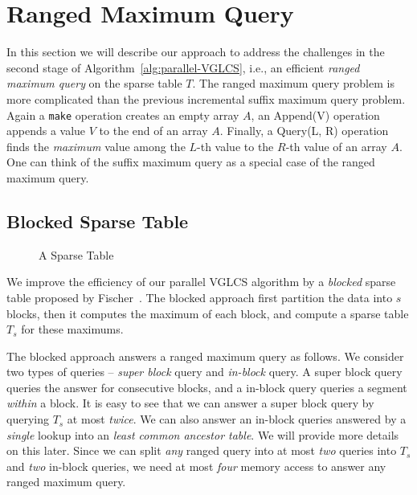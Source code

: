\section{Ranged Maximum Query} \label{sec:parallelRMQ}

In this section we will describe our approach to address the
challenges in the second stage of Algorithm~\ref{alg:parallel-VGLCS},
i.e., an efficient {\em ranged maximum query} on the sparse table $T$.
The ranged maximum query problem is more complicated than the previous
incremental suffix maximum query problem.  Again a {\tt make}
operation creates an empty array $A$, an {\sc Append(V)} operation
appends a value $V$ to the end of an array $A$.  Finally, a {\sc
  Query(L, R)} operation finds the {\em maximum} value among the
$L$-th value to the $R$-th value of an array $A$.  One can think of
the suffix maximum query as a special case of the ranged maximum
query.


\subsection{Blocked Sparse Table} \label{sec:blocked-sparse-table}

\begin{figure}[!thb]
  \centering {} 
  \caption{A Sparse Table}
  \label{fig:block-interval-decomposition}
\end{figure}

We improve the efficiency of our parallel VGLCS algorithm by a {\em
  blocked} sparse table proposed by
Fischer~\cite{Fischer2006TheoreticalAP}.  The blocked approach first
partition the data into $s$ blocks, then it computes the maximum of
each block, and compute a sparse table $T_s$ for these maximums.

The blocked approach answers a ranged maximum query as follows.  We
consider two types of queries -- {\em super block} query and {\em
  in-block} query.  A super block query queries the answer for
consecutive blocks, and a in-block query queries a segment {\em
  within} a block.  It is easy to see that we can answer a super block
query by querying $T_s$ at most {\em twice}.  We can also answer an
in-block queries answered by a {\em single} lookup into an {\em least
  common ancestor table}.  We will provide more details on this later.
Since we can split {\em any} ranged query into at most {\em two}
queries into $T_s$ and {\em two} in-block queries, we need at most
{\em four} memory access to answer any ranged maximum query.

